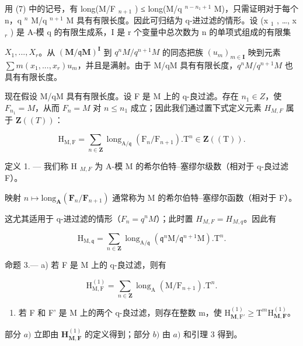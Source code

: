 用 (7) 中的记号，有 long(M/F \(_{n+1}\) ) ≤ long(M/q \(^{n-n_1+1}\) M)，只需证明对于每个 n，q \(^{n}\) M/q \(^{n+1}\) M 具有有限长度。因此可归结为 q-进过滤的情形。设 (x \(_{1}\) , \ldots, x \(_{r}\) ) 是 A-模 q 的有限生成系，I 是 r 个变量中总次数为 n 的单项式组成的有限集

\(X_{1},...,X_{r}\)。从 \((\mathbf{M}/\mathfrak{q}\mathbf{M})^{\mathbf{I}}\) 到 \(q^{n}M/q^{n+1}M\) 的同态把族 \((u_{m})_{m\in\mathbf{I}}\) 映到元素 \(\sum m(x_{1},...,x_{r})u_{m}\)，并且是满射。由于 M/qM 具有有限长度，\(q^{n}M/q^{n+1}M\) 也具有有限长度。

现在假设 M/qM 具有有限长度。设 F 是 M 上的 q-良过滤。存在 \(n_{1} \in Z\)，使 \(F_{n_{1}} = M\)，从而 \(F_{n} = M\) 对 \(n \leqslant n_{1}\) 成立；因此我们通过置下式定义元素 \(H_{M,F}\) 属于 \(\mathbf{Z}((T))\)：

\[
\mathrm{H} _ {\mathrm{M}, \mathrm{F}} = \sum_ {n \in \mathbf {Z}} \operatorname{long} _ {\mathrm{A} / \mathfrak {q}} (\mathrm{F} _ {n} / \mathrm{F} _ {n + 1}). \mathrm{T} ^ {n} \in \mathbf {Z} ((\mathrm{T})) .\tag{8}
\]

定义 1. --- 我们称 H \(_{M,F}\) 为 A-模 M 的希尔伯特–塞缪尔级数（相对于 q-良过滤 F）。

映射 \(n\mapsto\text{long}_{\mathbf{A}}(\mathbf{F}_{n}/\mathbf{F}_{n+1})\) 通常称为 M 的希尔伯特–塞缪尔函数（相对于 F）。

这尤其适用于 q-进过滤的情形（\(F_{n} = q^{n}M\)）；此时置 \(H_{M,F} = H_{M,q}\)。因此有

\[
\mathrm{H} _ {\mathrm{M}, \mathfrak {q}} = \sum_ {n \in \mathbf {Z}} \operatorname{long} _ {\mathrm{A} / \mathfrak {q}} (\mathfrak {q} ^ {n} \mathrm{M} / \mathfrak {q} ^ {n + 1} \mathrm{M}). \mathrm{T} ^ {n}.\tag{9}
\]

命题 3.--- a) 若 F 是 M 上的 q-良过滤，则有

\[
\mathrm{H} _ {\mathrm{M}, \mathrm{F}} ^ {(1)} = \sum_ {n \in \mathbf {Z}} \operatorname{long} _ {\mathrm{A}} (\mathrm{M} / \mathrm{F} _ {n + 1}). \mathrm{T} ^ {n}.\tag{10}
\]

\begin{enumerate}
\def\labelenumi{\alph{enumi})}
\setcounter{enumi}{1}
\tightlist
\item
  若 F 和 F' 是 M 上的两个 q-良过滤，则存在整数 m，使 \(\mathrm{H}_{\mathbf{M},\mathrm{F}'}^{(1)} \geqslant \mathrm{T}^{m}\mathrm{H}_{\mathbf{M},\mathbf{F}}^{(1)}\)。
\end{enumerate}

部分 \(a)\) 立即由 \(\mathbf{H}_{\mathbf{M},\mathbf{F}}^{(1)}\) 的定义得到；部分 \(b)\) 由 \(a)\) 和引理 3 得到。

